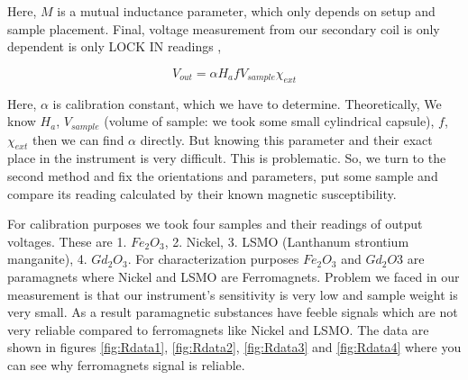 Here, $M$ is a mutual inductance parameter, which only depends on setup and sample placement. Final, voltage measurement from our secondary coil is only dependent is only LOCK IN readings \cite{cambr},

\begin{equation*}\label{thiseq}
V_{out} = \alpha H_a f V_{sample} \chi_{ext}
\end{equation*}

Here, $\alpha$ is calibration constant, which we have to determine. Theoretically, We know $H_a$, $V_{sample}$ (volume of sample: we took some small cylindrical capsule), $f$, $\chi_{ext}$ then we can find $\alpha$ directly. But knowing this parameter and their exact place in the instrument is very difficult. This is problematic. So, we turn to the second method and fix the orientations and parameters, put some sample and compare its reading calculated by their known magnetic susceptibility. 

For calibration purposes we took four samples and their readings of output voltages. These are 1. $Fe_2O_3$, 2. Nickel, 3. LSMO (Lanthanum strontium manganite), 4. $Gd_2O_3$. For characterization purposes $Fe_2O_3$ and $Gd_2O3$ are paramagnets where Nickel and LSMO are Ferromagnets. Problem we faced in our measurement is that our instrument’s sensitivity is very low and sample weight is very small. As a result paramagnetic substances have feeble signals which are not very reliable compared to ferromagnets like Nickel and LSMO. The data are shown in figures \ref{fig:Rdata1}, \ref{fig:Rdata2}, \ref{fig:Rdata3} and \ref{fig:Rdata4} where you can see why ferromagnets signal is reliable.

